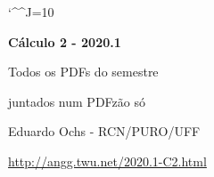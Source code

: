 \documentclass[oneside,12pt]{article}
\begin{document}

\def\drafturl{http://angg.twu.net/LATEX/2020-1-C2.pdf}
\def\drafturl{http://angg.twu.net/2020.1-C2.html}
\def\draftfooter{\tiny \href{\drafturl}{\jobname{}} \ColorBrown{\shorttoday{} \hours}}

\catcode`\^^J=10
\pu




%

\thispagestyle{empty}

\begin{center}

\vspace*{1.2cm}

{\bf \Large Cálculo 2 - 2020.1}

\bsk

Todos os PDFs do semestre

juntados num PDFzão só

\bsk

Eduardo Ochs - RCN/PURO/UFF

\url{http://angg.twu.net/2020.1-C2.html}

\end{center}

\newpage




\end{document}
